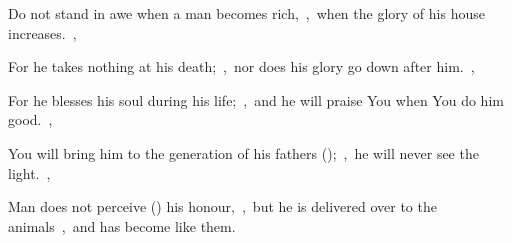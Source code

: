 \documentclass[12pt,twoside,a5paper]{article}
\begin{document}
\begin{normalparskip}
  Do not stand in awe when a man becomes rich,~\sep\ when the glory of his house increases.~\sep

  For he takes nothing at his death;~\sep\ nor does his glory go down after him.~\sep

  For he blesses his soul during his life;~\sep\ and he will praise You when You do him good.~\sep

  You will bring him to the generation of his fathers ();~\sep\ he will never see the light.~\sep

  Man does not perceive () his honour,~\sep\ but he is delivered over to the animals~\sep\ and has become like them.
\end{normalparskip}





\end{document}
